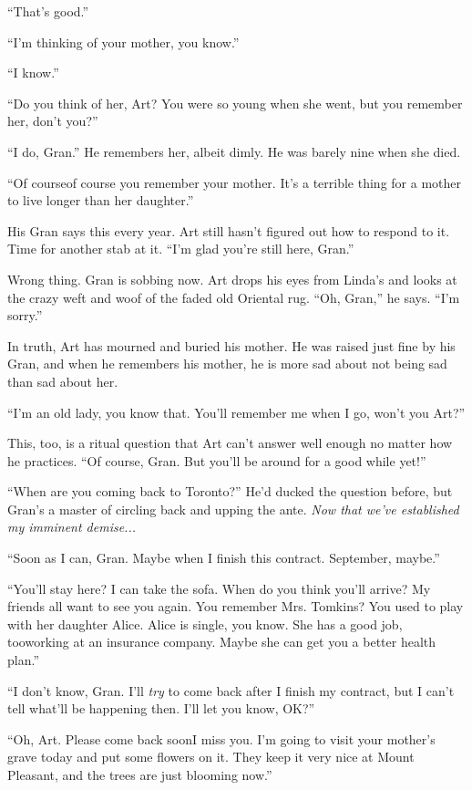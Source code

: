 “That’s good.”

“I’m thinking of your mother, you know.”

“I know.”

“Do you think of her, Art? You were so young when she went, but you
remember her, don’t you?”

“I do, Gran.” He remembers her, albeit dimly. He was barely nine
when she died.

“Of course{\dash}of course you remember your mother. It’s a terrible
thing for a mother to live longer than her daughter.”

His Gran says this every year. Art still hasn’t figured out how to
respond to it. Time for another stab at it. “I’m glad you’re still
here, Gran.”

Wrong thing. Gran is sobbing now. Art drops his eyes from Linda’s
and looks at the crazy weft and woof of the faded old Oriental rug.
“Oh, Gran,” he says. “I’m sorry.”

In truth, Art has mourned and buried his mother. He was raised just
fine by his Gran, and when he remembers his mother, he is more sad
about not being sad than sad about her.

“I’m an old lady, you know that. You’ll remember me when I go,
won’t you Art?”

This, too, is a ritual question that Art can’t answer well enough
no matter how he practices. “Of course, Gran. But you’ll be around
for a good while yet!”

“When are you coming back to Toronto?” He’d ducked the question
before, but Gran’s a master of circling back and upping the ante.
\emph{Now that we’ve established my imminent demise...}

“Soon as I can, Gran. Maybe when I finish this contract. September,
maybe.”

“You’ll stay here? I can take the sofa. When do you think you’ll
arrive? My friends all want to see you again. You remember Mrs.
Tomkins? You used to play with her daughter Alice. Alice is single,
you know. She has a good job, too{\dash}working at an insurance company.
Maybe she can get you a better health plan.”

“I don’t know, Gran. I’ll \emph{try} to come back after I finish my
contract, but I can’t tell what’ll be happening then. I’ll let you
know, OK?”

“Oh, Art. Please come back soon{\dash}I miss you. I’m going to visit your
mother’s grave today and put some flowers on it. They keep it very
nice at Mount Pleasant, and the trees are just blooming now.”

